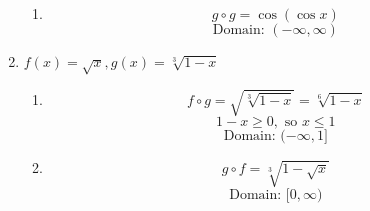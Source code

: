 \documentclass{article}
\begin{document}
\begin{enumerate}
\begin{enumerate}
				\item
				$$g \circ g = \cos(\cos x)$$
				$$\text{Domain: } (-\infty, \infty)$$
			\end{enumerate}

		\item $f(x) = \sqrt{x}, g(x) = \sqrt[3]{1 - x}$

			\begin{enumerate}
				\item
				$$f \circ g = \sqrt{\sqrt[3]{1-x}} = \sqrt[6]{1-x}$$
				$$ 1 - x \geq 0, \text{ so } x \leq 1$$
				$$\text{Domain: } (-\infty, 1]$$

				\item
				$$g \circ f = \sqrt[3]{1 - \sqrt{x}}$$
				$$ \text{Domain: } [0, \infty)$$
			\end{enumerate}

	\end{enumerate}
\end{document}
